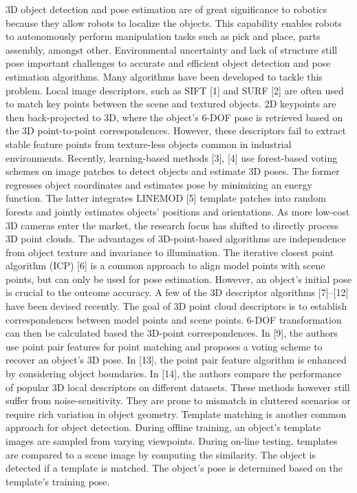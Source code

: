 \documentclass[10]{article}
\begin{document}
3D object detection and pose estimation are of great significance to robotics because they allow robots to localize the objects. This capability enables robots to autonomously perform manipulation tasks such as pick and place, parts assembly, amongst other. Environmental uncertainty and lack of structure still pose important challenges to accurate and efficient object detection and pose estimation algorithms. 
Many algorithms have been developed to tackle this problem. Local image descriptors, such as SIFT [1] and SURF [2] are often used to match key points between the scene and textured objects. 2D keypoints are then back-projected to 3D, where the object’s 6-DOF pose is retrieved based on the 3D point-to-point correspondences. However, these descriptors fail to extract stable feature points from texture-less objects common in industrial environments. Recently, learning-based methods [3], [4] use forest-based voting schemes on image patches to detect objects and estimate 3D poses. The former regresses object coordinates and estimates pose by minimizing an energy function. The latter integrates LINEMOD [5] template patches into random forests and jointly estimates objects’ positions and orientations. As more low-cost 3D cameras enter the market, the research focus has shifted to directly process 3D point clouds. The advantages of 3D-point-based algorithms are independence from object texture and invariance to illumination. The iterative closest point algorithm (ICP) [6] is a common approach to align model points with scene points, but can only be used for pose estimation. However, an object’s initial pose is crucial to the outcome accuracy. A few of the 3D descriptor algorithms [7]–[12] have been devised recently. The goal of 3D point cloud descriptors is to establish correspondences between model points and scene points. 6-DOF transformation can then be calculated based the 3D-point correspondences. In [9], the authors use point pair features for point matching and proposes a voting scheme to recover an object’s 3D pose. In [13], the point pair feature algorithm is enhanced by considering object boundaries. In [14], the authors compare the performance of popular 3D local descriptors on different datasets. These methods however still suffer from noise-sensitivity. They are prone to mismatch in cluttered scenarios or require rich variation in object geometry.
Template matching is another common approach for object detection. During offline training, an object’s template images are sampled from varying viewpoints. During on-line testing, templates are compared to a scene image by computing the similarity. The object is detected if a template is matched. The object’s pose is determined based on the template’s training pose.
\end{document}
